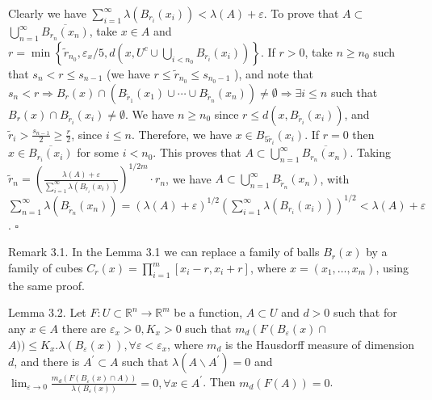 \documentclass[10pt]{article}
\begin{document}
Clearly we have $\sum_{i=1}^{\infty} \lambda\left(B_{r_{i}}\left(x_{i}\right)\right)<\lambda(A)+\varepsilon$. To prove that $A \subset$ $\bigcup_{n=1}^{\infty} \overline{B_{r_{n}}\left(x_{n}\right)}$, take $x \in A$ and $r=\min \left\{\tilde{r}_{n_{0}}, \varepsilon_{x} / 5, d\left(x, U^{c} \cup \bigcup_{i<n_{0}} B_{r_{i}}\left(x_{i}\right)\right)\right\}$. If $r>0$, take $n \geq n_{0}$ such that $s_{n}<r \leq s_{n-1}$ (we have $r \leq \tilde{r}_{n_{0}} \leq s_{n_{0}-1}$ ), and note that $s_{n}<r \Rightarrow B_{r}(x) \cap\left(B_{\tilde{r}_{1}}\left(x_{1}\right) \cup \cdots \cup B_{\tilde{r}_{n}}\left(x_{n}\right)\right) \neq \emptyset \Rightarrow \exists i \leq n$ such that $B_{r}(x) \cap B_{\tilde{r}_{i}}\left(x_{i}\right) \neq \emptyset$. We have $n \geq n_{0}$ since $r \leq d\left(x, B_{\tilde{r}_{i}}\left(x_{i}\right)\right)$, and $\tilde{r}_{i}>\frac{s_{n-1}}{2} \geq \frac{r}{2}$, since $i \leq n$. Therefore, we have $x \in B_{5 \tilde{r}_{i}}\left(x_{i}\right)$. If $r=0$ then $x \in \overline{B_{r_{i}}\left(x_{i}\right)}$ for some $i<n_{0}$. This proves that $A \subset \bigcup_{n=1}^{\infty} \overline{B_{r_{n}}\left(x_{n}\right)}$. Taking $\tilde{r}_{n}=\left(\frac{\lambda(A)+\varepsilon}{\sum_{i=1}^{\infty} \lambda\left(B_{r_{i}}\left(x_{i}\right)\right)}\right)^{1 / 2 m} \cdot r_{n}$, we have $A \subset \bigcup_{n=1}^{\infty} B_{\tilde{r}_{n}}\left(x_{n}\right)$, with $\sum_{n=1}^{\infty} \lambda\left(B_{\tilde{r}_{n}}\left(x_{n}\right)\right)=(\lambda(A)+\varepsilon)^{1 / 2}\left(\sum_{i=1}^{\infty} \lambda\left(B_{r_{i}}\left(x_{i}\right)\right)\right)^{1 / 2}<\lambda(A)+\varepsilon$. \(\square\)

Remark 3.1. In the Lemma 3.1 we can replace a family of balls $B_{r}(x)$ by a family of cubes $C_{r}(x)=\prod_{i=1}^{m}\left[x_{i}-r, x_{i}+r\right]$, where $x=\left(x_{1}, \ldots, x_{m}\right)$, using the same proof.

Lemma 3.2. Let $F: U \subset \mathbb{R}^{n} \rightarrow \mathbb{R}^{m}$ be a function, $A \subset U$ and $d>0$ such that for any $x \in A$ there are $\varepsilon_{x}>0, K_{x}>0$ such that $m_{d}\left(F\left(B_{\varepsilon}(x) \cap\right.\right.$ $A)) \leq K_{x} . \lambda\left(B_{\varepsilon}(x)\right), \forall \varepsilon<\varepsilon_{x}$, where $m_{d}$ is the Hausdorff measure of dimension $d$, and there is $A^{\prime} \subset A$ such that $\lambda\left(A \backslash A^{\prime}\right)=0$ and $\lim _{\varepsilon \rightarrow 0} \frac{m_{d}\left(F\left(B_{\varepsilon}(x) \cap A\right)\right)}{\lambda\left(B_{\varepsilon}(x)\right)}=0, \forall x \in A^{\prime}$. Then $m_{d}(F(A))=0$.
\end{document}
